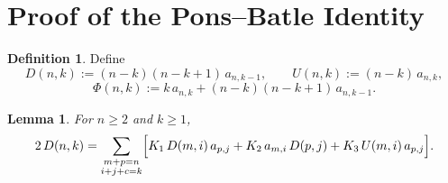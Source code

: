 \documentclass[11pt]{article}
\newtheorem{lemma}[theorem]{Lemma}
\theoremstyle{definition}
\newtheorem{definition}[theorem]{Definition}
\theoremstyle{remark}
\newcommand{\RR}{\Upsilon}
\newcommand{\TC}{\text{TC}}
\begin{document}
\section{Proof of the Pons--Batle Identity}\label{sec:candidate}

\begin{definition}\label{def:cand}
Define
\[
  D(n,k):=(n-k)(n-k+1)\,a_{n,k-1},\qquad U(n,k):=(n-k)\,a_{n,k},
\]
\[
  \Phi(n,k):=k\,a_{n,k}+(n-k)(n-k+1)\,a_{n,k-1}.
\]
\end{definition}


\begin{lemma} \label{lem:twomark}
For $n\ge2$ and $k\ge1$,
\begin{eqnarray}
 2\,D(n,k)=\sum_{\substack{m+p=n\\ i+j+c=k}}
  \Bigl[K_1\,D(m,i)\,a_{p, j}+K_2\,a_{m, i}\,D(p,j)+K_3\,U(m,i)\,a_{p, j}\Bigr]. \label{eq:twomark}
\end{eqnarray}
\end{lemma}
\end{document}

